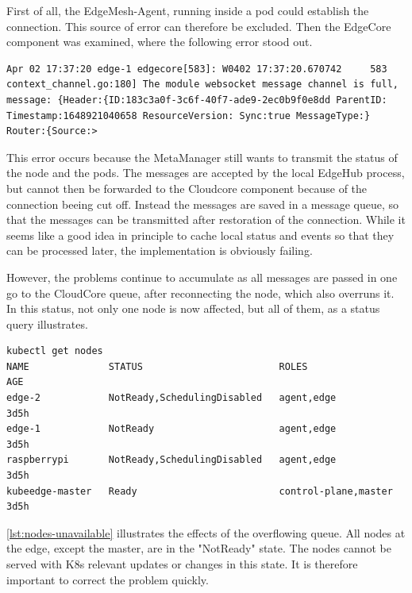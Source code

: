 \documentclass[MIC,Master,english]{twbook}%
\begin{document}
First of all, the EdgeMesh-Agent, running inside a pod could establish the connection. This source of error can therefore be excluded. Then the EdgeCore component was examined, where the following error stood out.

\vspace{\baselineskip}
\begin{minipage}{\linewidth}
    \begin{lstlisting}[caption={EdgeCore Error},captionpos=b]
Apr 02 17:37:20 edge-1 edgecore[583]: W0402 17:37:20.670742     583 context_channel.go:180] The module websocket message channel is full, message: {Header:{ID:183c3a0f-3c6f-40f7-ade9-2ec0b9f0e8dd ParentID: Timestamp:1648921040658 ResourceVersion: Sync:true MessageType:} Router:{Source:>
    \end{lstlisting}
\end{minipage}

This error occurs because the MetaManager still wants to transmit the status of the node and the pods. The messages are accepted by the local EdgeHub process, but cannot then be forwarded to the Cloudcore component because of the connection beeing cut off. Instead the messages are saved in a message queue, so that the messages can be transmitted after restoration of the connection. While it seems like a good idea in principle to cache local status and events so that they can be processed later, the implementation is obviously failing. \par

However, the problems continue to accumulate as all messages are passed in one go to the CloudCore queue, after reconnecting the node, which also overruns it. In this status, not only one node is now affected, but all of them, as a status query illustrates.

\begin{lstlisting}[caption={EdgeCore nodes unavailable},captionpos=b,label=lst:nodes-unavailable]
kubectl get nodes
NAME              STATUS                        ROLES                  AGE
edge-2            NotReady,SchedulingDisabled   agent,edge             3d5h
edge-1            NotReady                      agent,edge             3d5h
raspberrypi       NotReady,SchedulingDisabled   agent,edge             3d5h
kubeedge-master   Ready                         control-plane,master   3d5h
\end{lstlisting}

\autoref{lst:nodes-unavailable} illustrates the effects of the overflowing queue. All nodes at the edge, except the master, are in the "NotReady" state. The nodes cannot be served with K8s relevant updates or changes in this state. It is therefore important to correct the problem quickly.\par
\end{document}
